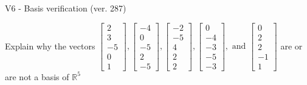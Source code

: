 \begin{exercise}
  \begin{exerciseTitle}V6 - Basis verification (ver. 287)\end{exerciseTitle}
  \begin{exerciseStatement}
    Explain why the vectors \(\left[\begin{array}{r}
2 \\
3 \\
-5 \\
0 \\
1
\end{array}\right] , \left[\begin{array}{r}
-4 \\
0 \\
-5 \\
2 \\
-5
\end{array}\right] , \left[\begin{array}{r}
-2 \\
-5 \\
4 \\
2 \\
2
\end{array}\right] , \left[\begin{array}{r}
0 \\
-4 \\
-3 \\
-5 \\
-3
\end{array}\right] , \text{ and } \left[\begin{array}{r}
0 \\
2 \\
2 \\
-1 \\
1
\end{array}\right]\) are or are not a basis of \(\mathbb{R}^5\)	



\end{exerciseStatement}
\end{exercise}
